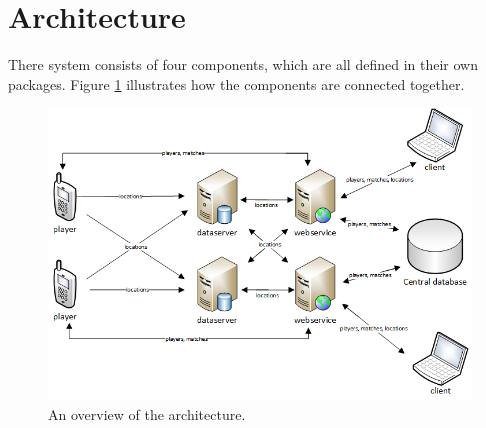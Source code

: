 \section{Architecture}
There system consists of four components, which are all defined in their own packages. Figure \ref{fig:img-architecture} illustrates how the components are connected together.

\FloatBarrier
\begin{figure}
\centering
\includegraphics[scale=0.7]{img/architecture.png}
\caption{An overview of the architecture.}
\label{fig:img-architecture}
\end{figure}

